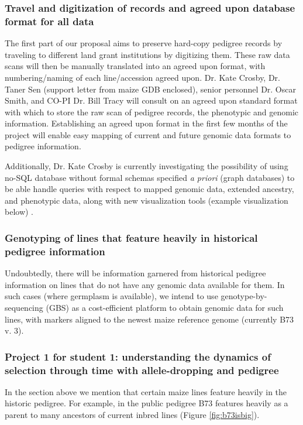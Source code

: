 \documentclass[12pt]{article}
\begin{document}
\subsubsection*{Travel and digitization of records and agreed upon database format for all data}
The first part of our proposal aims to preserve hard-copy pedigree records by traveling to different land grant institutions by digitizing them. These raw data scans will then be manually translated into an agreed upon format, with numbering/naming of each line/accession agreed upon.
Dr. Kate Crosby, Dr. Taner Sen (support letter from maize GDB enclosed), senior personnel Dr. Oscar Smith, and CO-PI Dr. Bill Tracy will consult on an agreed upon standard format with which to store the raw scan of pedigree records, the phenotypic and genomic information. Establishing an agreed upon format in the first few months of the project will enable easy mapping of current and future genomic data formats to pedigree information.
\par Additionally, Dr. Kate Crosby is currently investigating the possibility of using no-SQL database without formal schemas specified \textit{a priori} (graph databases) to be able handle queries with respect to mapped genomic data, extended ancestry, and phenotypic data, along with new visualization tools (example visualization below) \citep{ParejaTobes:2015bf}.



\subsubsection*{Genotyping of lines that feature heavily in historical pedigree information}
Undoubtedly, there will be information garnered from historical pedigree information on lines that do not have any genomic data available for them. In such cases (where germplasm is available), we intend to use genotype-by-sequencing (GBS) \citep{Elshire:2011ha} as a cost-efficient platform \citep{Glaubitz:2014eu} to obtain genomic data for such lines, with markers aligned to the newest maize reference genome (currently B73 v. 3). 

\subsubsection*{Project 1 for student 1: understanding the dynamics of selection through time with allele-dropping and pedigree}
In the section above we mention that certain maize lines feature heavily in the historic pedigree. For example, in the public pedigree B73 features heavily as a parent to many ancestors of current inbred lines (Figure \ref{fig:b73isbig}). 
\end{document}
